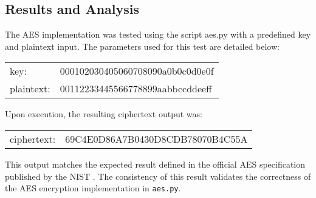 \subsection{Results and Analysis}

The AES implementation was tested using the script aes.py with a predefined key and plaintext input. 
The parameters used for this test are detailed below:

{\ttfamily
\begin{tabular}{ll}
    key: & 000102030405060708090a0b0c0d0e0f\\
    plaintext:\quad & 00112233445566778899aabbccddeeff
\end{tabular}
}

Upon execution, the resulting ciphertext output was:

{\ttfamily
\begin{tabular}{ll}
    ciphertext: & 69C4E0D86A7B0430D8CDB78070B4C55A
\end{tabular}
}

This output matches the expected result defined in the official \gls{AES} specification published by the \gls{NIST} \cite{NIST_AES}.
The consistency of this result validates the correctness of the \gls{AES} encryption implementation in \texttt{aes.py}.
